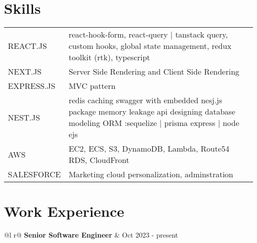 \documentclass[a4paper,12pt]{article}
\begin{document}
\section{Skills}
\begin{tabularx}{\linewidth}{@{}l X@{}}	

REACT.JS &  \normalsize{react-hook-form,
react-query | tanstack query,
custom hooks,
global state management,
redux toolkit (rtk),
typescript}\\
NEXT.JS  &  \normalsize{ Server Side Rendering and Client Side Rendering}\\ 
EXPRESS.JS  &  \normalsize{MVC pattern}\\ 
NEST.JS  &  \normalsize{redis caching
swagger with embedded nesj.js package
memory leakage
api designing
database modeling
ORM :sequelize | prisma
express | node
ejs}\\ 
AWS  &  \normalsize{EC2, ECS, S3, DynamoDB, Lambda, Route54 RDS, CloudFront}\\ 
SALESFORCE  &  \normalsize{Marketing cloud personalization, adminstration}\\ 
\end{tabularx}



\section{Work Experience}

\begin{tabularx}{\linewidth}{ @{}l r@{} }
\textbf{Senior Software Engineer} & \hfill Oct 2023 - present \\[3.75pt]
\end{tabularx}
\end{document}
